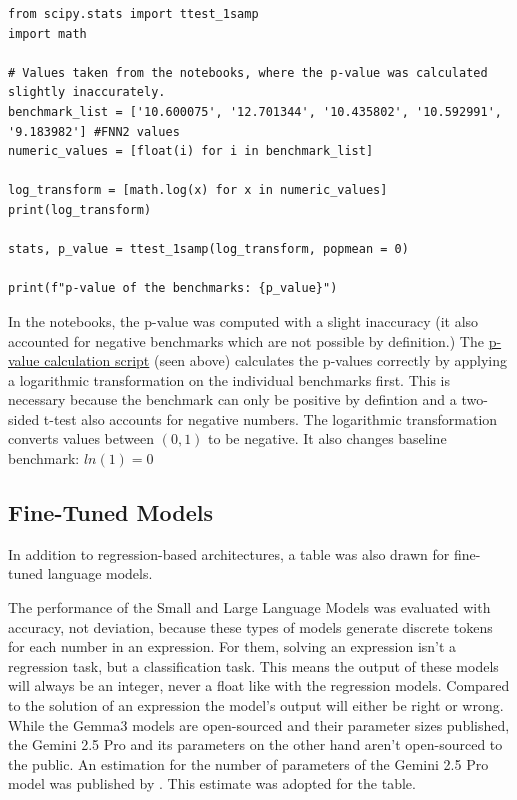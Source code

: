 \documentclass{article}
\begin{document}
\begin{Verbatim}
from scipy.stats import ttest_1samp
import math

# Values taken from the notebooks, where the p-value was calculated slightly inaccurately.
benchmark_list = ['10.600075', '12.701344', '10.435802', '10.592991', '9.183982'] #FNN2 values
numeric_values = [float(i) for i in benchmark_list]

log_transform = [math.log(x) for x in numeric_values]
print(log_transform)

stats, p_value = ttest_1samp(log_transform, popmean = 0)

print(f"p-value of the benchmarks: {p_value}")
\end{Verbatim}
In the notebooks, the p-value was computed with a slight inaccuracy (it also accounted for negative benchmarks which are not possible by definition.)
The \href{https://github.com/AntonStantan/matura/blob/main/get_p-value.py}{p-value calculation script} (seen above) calculates the p-values correctly by applying a logarithmic transformation on the individual benchmarks first.
This is necessary because the benchmark can only be positive by defintion and a two-sided t-test also accounts for negative numbers. The logarithmic transformation converts values between $(0,1)$ to be negative. It also changes baseline benchmark: $ln(1) = 0$

\subsection{Fine-Tuned Models}
In addition to regression-based architectures, a table was also drawn for fine-tuned language models.

The performance of the Small and Large Language Models was evaluated with accuracy, not deviation, because these types of models generate discrete tokens for each number in an expression. For them, solving an expression isn't a regression task, but a classification task. This means the output of these models will always be an integer, never a float like with the regression models. Compared to the solution of an expression the model's output will either be right or wrong.
\\[1em]
While the Gemma3 models are open-sourced and their parameter sizes published, the Gemini 2.5 Pro and its parameters on the other hand aren't open-sourced to the public.
An estimation for the number of parameters of the Gemini 2.5 Pro model was published by \cite{chadha2025gemini}. This estimate was adopted for the table.
\end{document}
